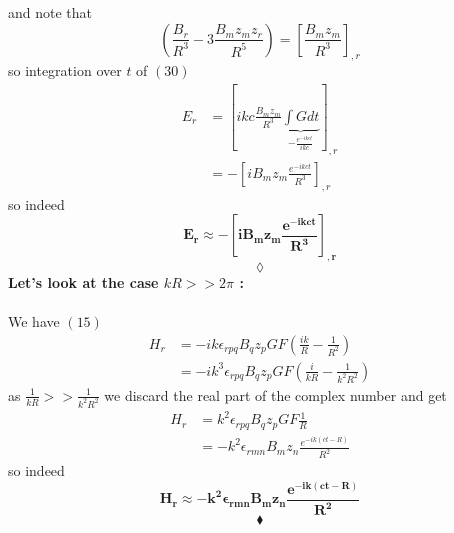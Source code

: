 and note that $$\left(\frac{B_r}{R^3} -3\frac{B_mz_mz_r}{R^5}\right)=\left[\frac{B_mz_m}{R^3}\right]_{,r}$$
so integration over $t$ of $(30)$
\begin{align}
E_r &= \left[ikc\frac{B_mz_m}{R^3}\underbrace{\int Gdt}_{-\frac{e^{-ikct}}{ikc}}\right]_{,r}\\
&= -\left[iB_mz_m\frac{e^{-ikct}}{R^3}\right]_{,r}
\end{align}
so indeed 
$$\mathbf{E_r\approx-\left[iB_mz_m\frac{e^{-ikct}}{R^3}\right]_{,r}}$$
$$\lozenge$$
\textbf{Let's look at the case $kR >> 2\pi$ :}\\\\
We have $(15)$
\begin{align}
H_r&=  -ik\epsilon_{rpq}B_qz_pGF\left(\frac{ik}{R}-\frac{1}{R^2}\right)\\
&=  -ik^3\epsilon_{rpq}B_qz_pGF\left(\frac{i}{kR}-\frac{1}{k^2R^2}\right)
\end{align}
as $ \frac{1}{kR}>>\frac{1}{k^2R^2}$ we discard the real part of the complex number and get 
\begin{align}
H_r&=  k^2\epsilon_{rpq}B_qz_pGF\frac{1}{R}\\
&= -k^2\epsilon_{rmn}B_mz_n\frac{e^{-ik(ct-R)}}{R^2}
\end{align}
so indeed $$\mathbf{H_r\approx -k^2\epsilon_{rmn}B_mz_n\frac{e^{-ik(ct-R)}}{R^2}}$$
$$\blacklozenge$$
\newpage

